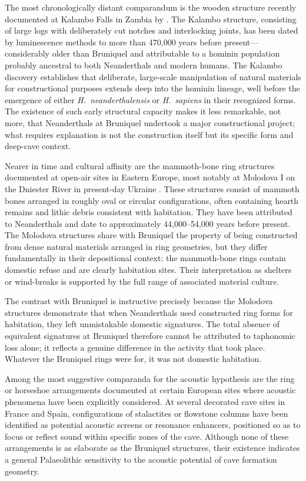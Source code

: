 \documentclass[12pt]{article}
\begin{document}
The most chronologically distant comparandum is the wooden structure recently documented at Kalambo Falls in Zambia by \citet{Barham2023}. The Kalambo structure, consisting of large logs with deliberately cut notches and interlocking joints, has been dated by luminescence methods to more than 470,000 years before present—considerably older than Bruniquel and attributable to a hominin population probably ancestral to both Neanderthals and modern humans. The Kalambo discovery establishes that deliberate, large-scale manipulation of natural materials for constructional purposes extends deep into the hominin lineage, well before the emergence of either \textit{H.\ neanderthalensis} or \textit{H.\ sapiens} in their recognized forms. The existence of such early structural capacity makes it less remarkable, not more, that Neanderthals at Bruniquel undertook a major constructional project; what requires explanation is not the construction itself but its specific form and deep-cave context.

Nearer in time and cultural affinity are the mammoth-bone ring structures documented at open-air sites in Eastern Europe, most notably at Molodova I on the Dniester River in present-day Ukraine \citep{Soffer1993}. These structures consist of mammoth bones arranged in roughly oval or circular configurations, often containing hearth remains and lithic debris consistent with habitation. They have been attributed to Neanderthals and date to approximately 44,000--54,000 years before present. The Molodova structures share with Bruniquel the property of being constructed from dense natural materials arranged in ring geometries, but they differ fundamentally in their depositional context: the mammoth-bone rings contain domestic refuse and are clearly habitation sites. Their interpretation as shelters or wind-breaks is supported by the full range of associated material culture.

The contrast with Bruniquel is instructive precisely because the Molodova structures demonstrate that when Neanderthals used constructed ring forms for habitation, they left unmistakable domestic signatures. The total absence of equivalent signatures at Bruniquel therefore cannot be attributed to taphonomic loss alone; it reflects a genuine difference in the activity that took place. Whatever the Bruniquel rings were for, it was not domestic habitation.

Among the most suggestive comparanda for the acoustic hypothesis are the ring or horseshoe arrangements documented at certain European sites where acoustic phenomena have been explicitly considered. At several decorated cave sites in France and Spain, configurations of stalactites or flowstone columns have been identified as potential acoustic screens or resonance enhancers, positioned so as to focus or reflect sound within specific zones of the cave. Although none of these arrangements is as elaborate as the Bruniquel structures, their existence indicates a general Palaeolithic sensitivity to the acoustic potential of cave formation geometry.
\end{document}
